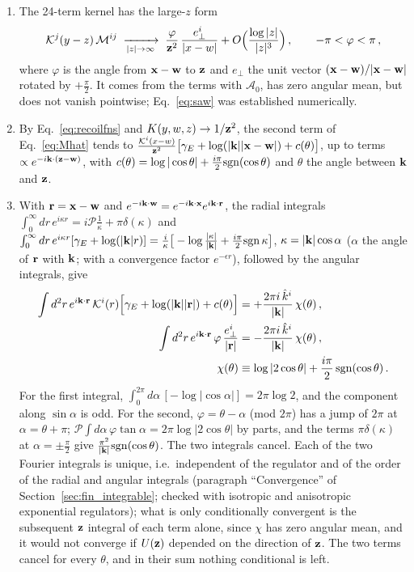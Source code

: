 \begin{enumerate}
\item The 24-term kernel has the large-$z$ form
\begin{align}\label{eq:saw}
\mathcal{K}^j(y-z)\,\mathcal M^{ij}\;\xrightarrow[|z|\to\infty]{}\;\frac{\varphi}{\mathbf{z}^2}\,\frac{e_\perp^i}{|x-w|}+O\Big(\frac{\log|z|}{|z|^3}\Big)\,,\qquad-\pi<\varphi<\pi\,,
\end{align}
where $\varphi$ is the angle from $\mathbf{x}-\mathbf{w}$ to $\mathbf{z}$ and $e_\perp$ the unit vector $(\mathbf{x}-\mathbf{w})/|\mathbf{x}-\mathbf{w}|$ rotated by $+\frac\pi2$. It comes from the terms with $\mathcal A_0$, has zero angular mean, but does not vanish pointwise; Eq.~\eqref{eq:saw} was established numerically.
\item By Eq.~\eqref{eq:recoilfns} and $K(y,w,z)\to1/\mathbf{z}^2$, the second term of Eq.~\eqref{eq:Mhat} tends to $\frac{\mathcal{K}^i(x-w)}{\mathbf{z}^2}\big[\gamma_E+\log(|\mathbf{k}||\mathbf{x}-\mathbf{w}|)+c(\theta)\big]$, up to terms $\propto e^{-i\mathbf{k}\cdot(\mathbf{z}-\mathbf{w})}$, with $c(\theta)=\log|\cos\theta|+\frac{i\pi}{2}{\rm sgn}(\cos\theta)$ and $\theta$ the angle between $\mathbf{k}$ and $\mathbf{z}$.
\item With $\mathbf{r}=\mathbf{x}-\mathbf{w}$ and $e^{-i\mathbf{k}\cdot\mathbf{w}}=e^{-i\mathbf{k}\cdot\mathbf{x}}e^{i\mathbf{k}\cdot\mathbf{r}}$, the radial integrals $\int_0^\infty dr\,e^{i\kappa r}=i\mathcal P\frac1\kappa+\pi\delta(\kappa)$ and $\int_0^\infty dr\,e^{i\kappa r}[\gamma_E+\log(|\mathbf{k}|r)]=\frac{i}{\kappa}\big[-\log\frac{|\kappa|}{|\mathbf{k}|}+\frac{i\pi}{2}{\rm sgn}\,\kappa\big]$, $\kappa=|\mathbf{k}|\cos\alpha$ ($\alpha$ the angle of $\mathbf{r}$ with $\mathbf{k}$; with a convergence factor $e^{-\epsilon r}$), followed by the angular integrals, give
\begin{align}\label{eq:sawid}
\int d^2r\,e^{i\mathbf{k}\cdot\mathbf{r}}\,\mathcal{K}^i(r)\Big[\gamma_E+\log(|\mathbf{k}||\mathbf{r}|)+c(\theta)\Big]&=+\frac{2\pi i\,\hat k^i}{|\mathbf{k}|}\,\chi(\theta)\,,\notag\\
\int d^2r\,e^{i\mathbf{k}\cdot\mathbf{r}}\,\varphi\,\frac{e_\perp^i}{|\mathbf{r}|}&=-\frac{2\pi i\,\hat k^i}{|\mathbf{k}|}\,\chi(\theta)\,,\notag\\
\chi(\theta)&\equiv\log|2\cos\theta|+\frac{i\pi}{2}\,{\rm sgn}(\cos\theta)\,.
\end{align}
For the first integral, $\int_0^{2\pi}d\alpha\,[-\log|\cos\alpha|]=2\pi\log2$, and the component along $\sin\alpha$ is odd. For the second, $\varphi=\theta-\alpha$ (mod $2\pi$) has a jump of $2\pi$ at $\alpha=\theta+\pi$; $\mathcal P\!\int d\alpha\,\varphi\tan\alpha=2\pi\log|2\cos\theta|$ by parts, and the terms $\pi\delta(\kappa)$ at $\alpha=\pm\frac\pi2$ give $\frac{\pi^2}{|\mathbf{k}|}{\rm sgn}(\cos\theta)$. The two integrals cancel. Each of the two Fourier integrals is unique, i.e.\ independent of the regulator and of the order of the radial and angular integrals (paragraph ``Convergence'' of Section~\ref{sec:fin_integrable}; checked with isotropic and anisotropic exponential regulators); what is only conditionally convergent is the subsequent $\mathbf{z}$ integral of each term alone, since $\chi$ has zero angular mean, and it would not converge if $U(\mathbf{z})$ depended on the direction of $\mathbf{z}$. The two terms cancel for every $\theta$, and in their sum nothing conditional is left.
\end{enumerate}
